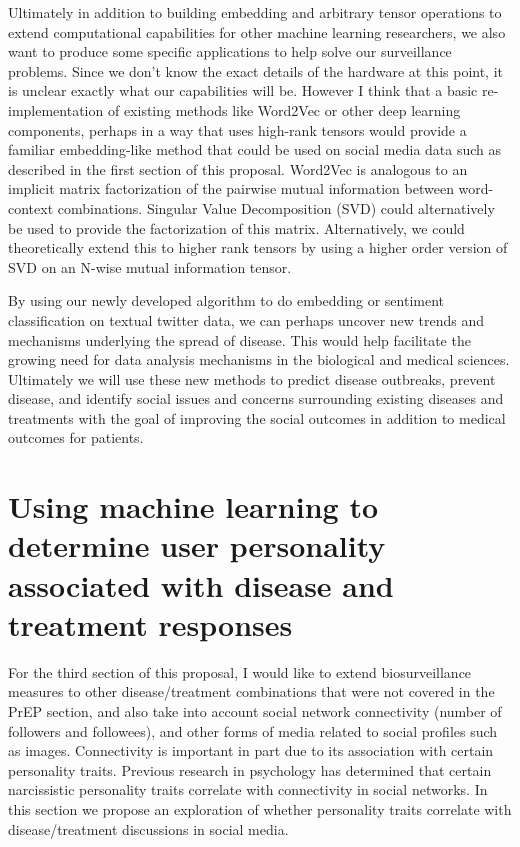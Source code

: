 Ultimately in addition to building embedding and arbitrary tensor operations to extend computational capabilities for other machine learning researchers, we also want to produce some specific applications to help solve our surveillance problems. Since we don't know the exact details of the hardware at this point, it is unclear exactly what our capabilities will be. However I think that a basic re-implementation of existing methods like Word2Vec or other deep learning components, perhaps in a way that uses high-rank tensors would provide a familiar embedding-like method that could be used on social media data such as described in the first section of this proposal. Word2Vec is analogous to an implicit matrix factorization of the pairwise mutual information between word-context combinations\cite{levy2014neural}. Singular Value Decomposition (SVD) could alternatively be used to provide the factorization of this matrix. Alternatively, we could theoretically extend this to higher rank tensors by using a higher order version of SVD on an N-wise mutual information tensor.

By using our newly developed algorithm to do embedding or sentiment classification on textual twitter data, we can perhaps uncover new trends and mechanisms underlying the spread of disease. This would help facilitate the growing need for data analysis mechanisms in the biological and medical sciences\cite{cichocki2014era}. Ultimately we will use these new methods to predict disease outbreaks, prevent disease, and identify social issues and concerns surrounding existing diseases and treatments with the goal of improving the social outcomes in addition to medical outcomes for patients.

\section{Using machine learning to determine user personality associated with disease and treatment responses}

For the third section of this proposal, I would like to extend biosurveillance measures to other disease/treatment combinations that were not covered in the PrEP section, and also take into account social network connectivity (number of followers and followees), and other forms of media related to social profiles such as images. Connectivity is important in part due to its association with certain personality traits. Previous research in psychology has determined that certain narcissistic personality traits correlate with connectivity in social networks\cite{buffardi2008narcissism}. In this section we propose an exploration of whether personality traits correlate with disease/treatment discussions in social media.

